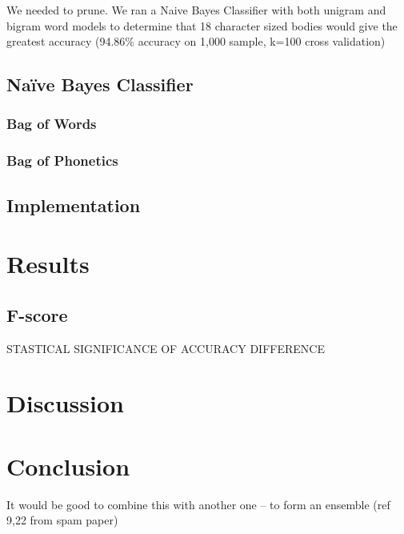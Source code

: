 \documentclass[10pt]{article}
\begin{document}
We needed to prune. We ran a Naive Bayes Classifier with both unigram and
bigram word models to determine that 18 character sized bodies would give the
greatest accuracy (94.86\% accuracy on 1,000 sample, k=100 cross validation)
\subsection{Naïve Bayes Classifier}
\label{sec-2-3}
\subsubsection{Bag of Words}
\label{sec-2-3-1}
\subsubsection{Bag of Phonetics}
\label{sec-2-3-2}
\subsection{Implementation}
\label{sec-2-4}
\section{Results}
\label{sec-3}
\subsection{F-score}
\label{sec-3-1}

STASTICAL SIGNIFICANCE OF ACCURACY DIFFERENCE
\section{Discussion}
\label{sec-4}
\section{Conclusion}
It would be good to combine this with another one -- to form an ensemble (ref
9,22 from spam paper)
\label{sec-5}





\end{document}
